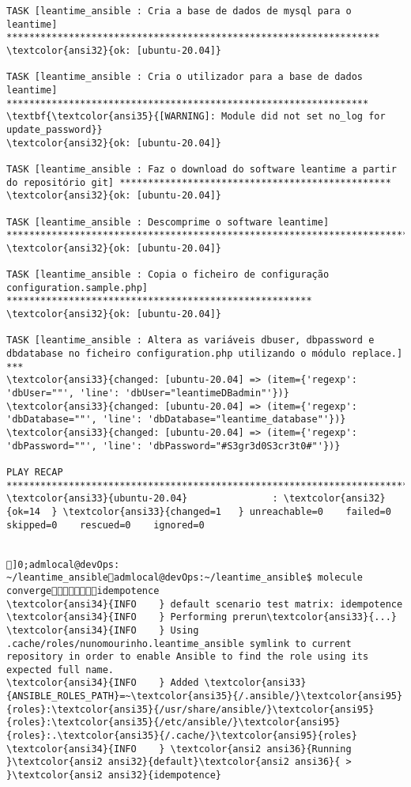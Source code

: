 \documentclass{scrartcl}
\begin{document}
\begin{Verbatim}
TASK [leantime_ansible : Cria a base de dados de mysql para o leantime] ******************************************************************
\textcolor{ansi32}{ok: [ubuntu-20.04]}

TASK [leantime_ansible : Cria o utilizador para a base de dados leantime] ****************************************************************
\textbf{\textcolor{ansi35}{[WARNING]: Module did not set no_log for update_password}}
\textcolor{ansi32}{ok: [ubuntu-20.04]}

TASK [leantime_ansible : Faz o download do software leantime a partir do repositório git] ************************************************
\textcolor{ansi32}{ok: [ubuntu-20.04]}

TASK [leantime_ansible : Descomprime o software leantime] ********************************************************************************
\textcolor{ansi32}{ok: [ubuntu-20.04]}

TASK [leantime_ansible : Copia o ficheiro de configuração configuration.sample.php] ******************************************************
\textcolor{ansi32}{ok: [ubuntu-20.04]}

TASK [leantime_ansible : Altera as variáveis dbuser, dbpassword e dbdatabase no ficheiro configuration.php utilizando o módulo replace.] ***
\textcolor{ansi33}{changed: [ubuntu-20.04] => (item={'regexp': 'dbUser=""', 'line': 'dbUser="leantimeDBadmin"'})}
\textcolor{ansi33}{changed: [ubuntu-20.04] => (item={'regexp': 'dbDatabase=""', 'line': 'dbDatabase="leantime_database"'})}
\textcolor{ansi33}{changed: [ubuntu-20.04] => (item={'regexp': 'dbPassword=""', 'line': 'dbPassword="#S3gr3d0S3cr3t0#"'})}

PLAY RECAP *******************************************************************************************************************************
\textcolor{ansi33}{ubuntu-20.04}               : \textcolor{ansi32}{ok=14  } \textcolor{ansi33}{changed=1   } unreachable=0    failed=0    skipped=0    rescued=0    ignored=0


]0;admlocal@devOps: ~/leantime_ansibleadmlocal@devOps:~/leantime_ansible$ molecule convergeidempotence
\textcolor{ansi34}{INFO    } default scenario test matrix: idempotence
\textcolor{ansi34}{INFO    } Performing prerun\textcolor{ansi33}{...}
\textcolor{ansi34}{INFO    } Using .cache/roles/nunomourinho.leantime_ansible symlink to current repository in order to enable Ansible to find the role using its expected full name.
\textcolor{ansi34}{INFO    } Added \textcolor{ansi33}{ANSIBLE_ROLES_PATH}=~\textcolor{ansi35}{/.ansible/}\textcolor{ansi95}{roles}:\textcolor{ansi35}{/usr/share/ansible/}\textcolor{ansi95}{roles}:\textcolor{ansi35}{/etc/ansible/}\textcolor{ansi95}{roles}:.\textcolor{ansi35}{/.cache/}\textcolor{ansi95}{roles}
\textcolor{ansi34}{INFO    } \textcolor{ansi2 ansi36}{Running }\textcolor{ansi2 ansi32}{default}\textcolor{ansi2 ansi36}{ > }\textcolor{ansi2 ansi32}{idempotence}


\end{Verbatim}
\end{document}
